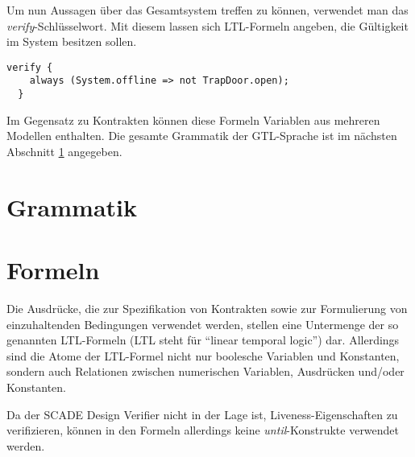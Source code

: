 Um nun Aussagen über das Gesamtsystem treffen zu können, verwendet man das \emph{verify}-Schlüsselwort.
Mit diesem lassen sich LTL-Formeln angeben, die Gültigkeit im System besitzen sollen.
\begin{lstlisting}[language=gtl]
  verify {
    always (System.offline => not TrapDoor.open);
  }
\end{lstlisting}
Im Gegensatz zu Kontrakten können diese Formeln Variablen aus mehreren Modellen enthalten.
Die gesamte Grammatik der GTL-Sprache ist im nächsten Abschnitt \ref{sec:grammar} angegeben.

\section{Grammatik}
\label{sec:grammar}


\section{Formeln}
\label{sec:formula}
Die Ausdrücke, die zur Spezifikation von Kontrakten sowie zur Formulierung von einzuhaltenden Bedingungen verwendet werden, stellen eine Untermenge der so genannten LTL-Formeln (LTL steht für "`linear temporal logic"') dar.
Allerdings sind die Atome der LTL-Formel nicht nur boolesche Variablen und Konstanten, sondern auch Relationen zwischen numerischen Variablen, Ausdrücken und/oder Konstanten.

Da der SCADE Design Verifier nicht in der Lage ist, Liveness-Eigenschaften zu verifizieren, können in den Formeln allerdings keine \emph{until}-Konstrukte verwendet werden.





